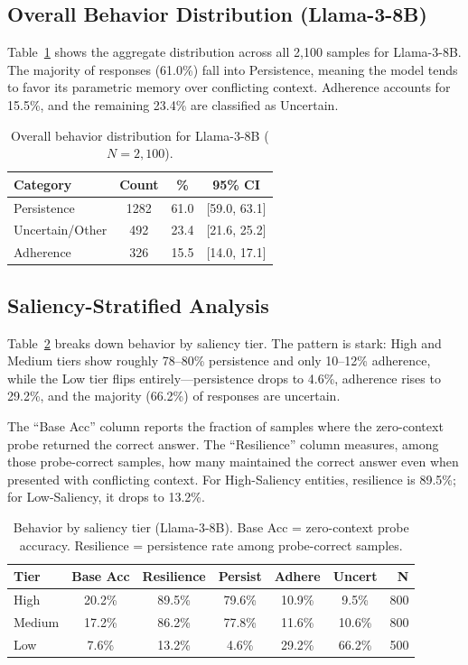 \documentclass[11pt, letterpaper]{article}
\begin{document}
\subsection*{Overall Behavior Distribution (Llama-3-8B)}

Table~\ref{tab:baseline} shows the aggregate distribution across all 2,100 samples for Llama-3-8B. The majority of responses (61.0\%) fall into Persistence, meaning the model tends to favor its parametric memory over conflicting context. Adherence accounts for 15.5\%, and the remaining 23.4\% are classified as Uncertain.

\begin{table}[H]
\centering
\caption{Overall behavior distribution for Llama-3-8B ($N=2{,}100$).}
\label{tab:baseline}
\begin{tabular}{l|ccc}
\toprule
\textbf{Category} & \textbf{Count} & \textbf{\%} & \textbf{95\% CI} \\
\midrule
Persistence     & 1282 & 61.0 & [59.0, 63.1] \\
Uncertain/Other &  492 & 23.4 & [21.6, 25.2] \\
Adherence       &  326 & 15.5 & [14.0, 17.1] \\
\bottomrule
\end{tabular}
\end{table}

\subsection*{Saliency-Stratified Analysis}

Table~\ref{tab:saliency} breaks down behavior by saliency tier. The pattern is stark: High and Medium tiers show roughly 78--80\% persistence and only 10--12\% adherence, while the Low tier flips entirely---persistence drops to 4.6\%, adherence rises to 29.2\%, and the majority (66.2\%) of responses are uncertain.

The ``Base Acc'' column reports the fraction of samples where the zero-context probe returned the correct answer. The ``Resilience'' column measures, among those probe-correct samples, how many maintained the correct answer even when presented with conflicting context. For High-Saliency entities, resilience is 89.5\%; for Low-Saliency, it drops to 13.2\%.

\begin{table}[H]
\centering
\caption{Behavior by saliency tier (Llama-3-8B). Base Acc = zero-context probe accuracy. Resilience = persistence rate among probe-correct samples.}
\label{tab:saliency}
\begin{tabular}{l|cc|ccc|r}
\toprule
\textbf{Tier} & \textbf{Base Acc} & \textbf{Resilience} & \textbf{Persist} & \textbf{Adhere} & \textbf{Uncert} & \textbf{N} \\
\midrule
High   & 20.2\% & 89.5\% & 79.6\% & 10.9\%  & 9.5\%  & 800 \\
Medium & 17.2\% & 86.2\% & 77.8\% & 11.6\% & 10.6\% & 800 \\
Low    & 7.6\%  & 13.2\% & 4.6\%  & 29.2\% & 66.2\% & 500 \\
\bottomrule
\end{tabular}
\end{table}
\end{document}
